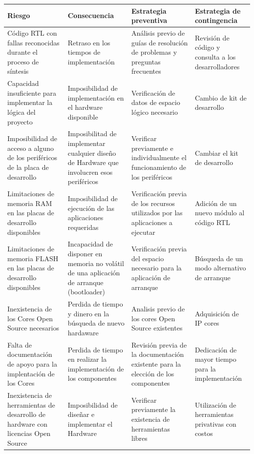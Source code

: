         \begin{table}[!h]
		\centering
		\begin{tabular}{ p{4cm} p{4cm} p{4cm} p{3cm} }
		\hline 
		\rowcolor[gray]{0.8} Riesgo & Consecuencia & Estrategia preventiva & Estrategia de contingencia\\
		\hline
		Código RTL con fallas reconocidas durante el proceso de síntesis& Retraso en los tiempos de implementación & Análisis previo de guías de resolución de problemas y preguntas frecuentes & Revisión de código y consulta a los desarrolladores \\
		\hline
		 Capacidad insuficiente para implementar la lógica del proyecto & Imposibilidad de implementación en el hardware disponible  & Verificación de datos de espacio lógico necesario  & Cambio de kit de desarrollo\\	 
		\hline
		 Imposibilidad de acceso a alguno de los periféricos de la placa de desarrollo & Imposibilitad de implementar cualquier diseño de Hardware que involucren esos periféricos& Verificar previamente e individualmente el funcionamiento de los periféricos & Cambiar el kit de desarrollo\\
		\hline
		Limitaciones de memoria RAM en las placas de desarrollo disponibles& Imposibilidad de ejecución de las aplicaciones requeridas & Verificación previa de los recursos utilizados por las aplicaciones a ejecutar & Adición de un nuevo módulo al código RTL  \\	 
		\hline
		Limitaciones de memoria FLASH en las placas de desarrollo disponibles& Incapacidad de disponer en memoria no volátil de una aplicación de arranque (bootloader) & Verificación previa del espacio necesario para la aplicación de arranque & Búsqueda de un modo alternativo de arranque\\ 
		\hline
		Inexistencia de los Cores Open Source necesarios& Perdida de tiempo y dinero en la búsqueda de nuevo hardaware& Analisis previo de los cores Open Source existentes & Adquisición de IP cores\\
		\hline
		Falta de documentación de apoyo para la implentación de los Cores & Perdida de tiempo en realizar la implementación de los componentes & Revisión previa de la documentación existente para la elección de los  componentes & Dedicación de mayor tiempo para la implementación\\ 
		\hline
		 Inexistencia de herramientas de desarrollo de hardware con licencias Open Source & Imposibilidad de diseñar e implementar el Hardware & Verificar previamente la existencia de herramientas libres & Utilización de herramientas privativas con costos\\
		\hline
		\end{tabular}
		\end{table}
